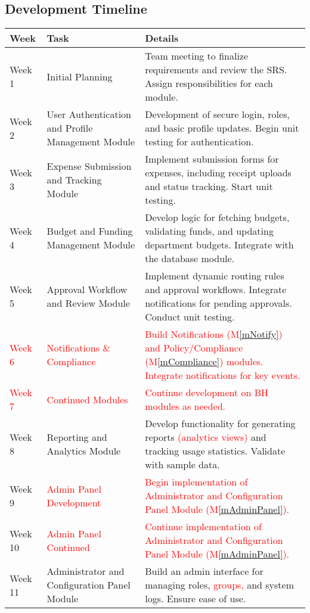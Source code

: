 \documentclass[12pt, titlepage]{article}
\providecommand{\mref}[1]{M\ref{#1}}
\begin{document}
\subsection{Development Timeline}
\begin{tabularx}{\textwidth}{|l|l|X|}
\hline
\textbf{Week} & \textbf{Task} & \textbf{Details} \\
\hline
Week 1 & Initial Planning & Team meeting to finalize requirements and review the SRS. Assign responsibilities for each module. \\
\hline
Week 2 & User Authentication and Profile Management Module & Development of secure login, roles, and basic profile updates. Begin unit testing for authentication. \\
\hline
Week 3 & Expense Submission and Tracking Module & Implement submission forms for expenses, including receipt uploads and status tracking. Start unit testing. \\
\hline
Week 4 & Budget and Funding Management Module & Develop logic for fetching budgets, validating funds, and updating department budgets. Integrate with the database module. \\
\hline
Week 5 & Approval Workflow and Review Module & Implement dynamic routing rules and approval workflows. Integrate notifications for pending approvals. Conduct unit testing. \\
\hline
\textcolor{red}{Week 6} & \textcolor{red}{Notifications \& Compliance} & \textcolor{red}{Build Notifications (\mref{mNotify}) and Policy/Compliance (\mref{mCompliance}) modules. Integrate notifications for key events.} \\
\hline
\textcolor{red}{Week 7} & \textcolor{red}{Continued Modules} & \textcolor{red}{Continue development on BH modules as needed.} \\
\hline
Week 8 & Reporting and Analytics Module & Develop functionality for generating reports \textcolor{red}{(analytics views)} and tracking usage statistics. Validate with sample data. \\
\hline
Week 9 & \textcolor{red}{Admin Panel Development} & \textcolor{red}{Begin implementation of Administrator and Configuration Panel Module (\mref{mAdminPanel}).} \\
\hline
Week 10 & \textcolor{red}{Admin Panel Continued} & \textcolor{red}{Continue implementation of Administrator and Configuration Panel Module (\mref{mAdminPanel}).} \\
\hline
Week 11 & Administrator and Configuration Panel Module & Build an admin interface for managing roles, \textcolor{red}{groups,} and system logs. Ensure ease of use. \\

\end{tabularx}
\end{document}

